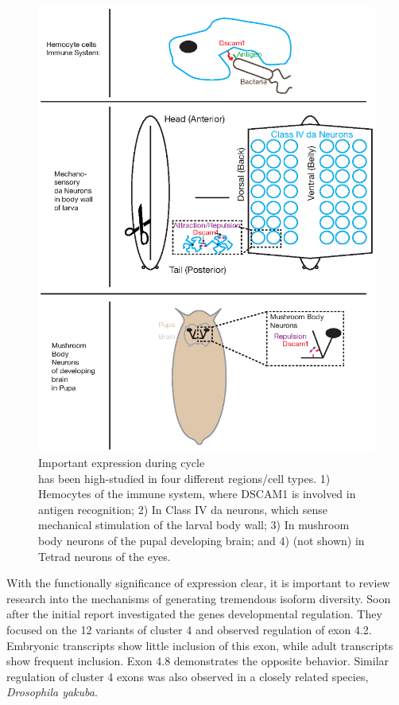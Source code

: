     \begin{figure} %
      \centering 
      \includegraphics{Figures/Intro/DscamAnatomy.eps}
      \caption[Important \dscam{} expression during \flies{} life cycle]
      {
        Important \dscam{} expression during \flies{} cycle\\[0.25cm]
        \dscam{} has been high-studied in four different regions/cell types. 1) Hemocytes of the immune system, where DSCAM1 is involved in antigen recognition; 2) In Class IV da neurons, which sense mechanical stimulation of the larval body wall; 3) In mushroom body neurons of the pupal developing brain; and 4) (not shown) in Tetrad neurons of the eyes.
        }
      \label{Intro:fig:DscamAnatomy}
      \end{figure}

    With the functionally significance of \dscam{} expression clear, it is important to review research into the mechanisms of generating tremendous isoform diversity. Soon after the initial \dscam{} report \citet{Celotto2001} investigated the genes developmental regulation. They focused on the 12 variants of cluster 4 and observed regulation of exon 4.2. Embryonic transcripts show little inclusion of this exon, while adult transcripts show frequent inclusion. Exon 4.8 demonstrates the opposite behavior. Similar regulation of cluster 4 exons was also observed in a closely related species, \textit{Drosophila yakuba}. 

